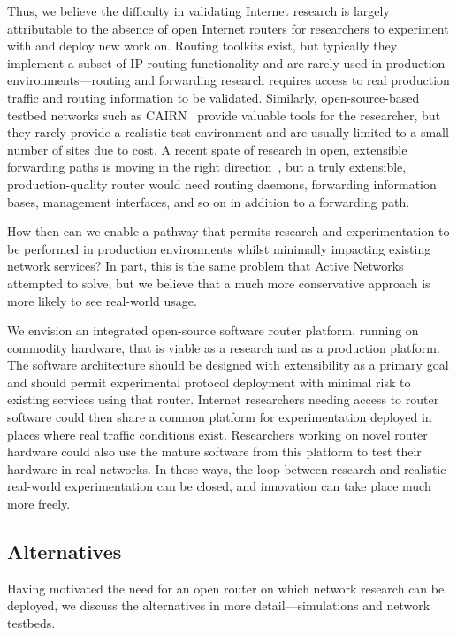 Thus, we believe the difficulty in validating Internet research is largely
attributable to
the absence of open Internet routers for researchers to
experiment with and deploy new work on.  Routing toolkits exist, but
typically they implement a subset of IP routing functionality and are
rarely used in production environments---routing and forwarding
research requires access to real production traffic and routing
information to be validated.
Similarly, open-source-based testbed networks such as CAIRN~\cite{cairn}
provide valuable tools for the researcher, 
but they rarely provide a realistic
test environment and are usually limited to a small number of sites
due to cost.
A recent spate of research in open, extensible forwarding
paths is moving in the right direction~\cite{click,pathrouter}, but
a truly extensible, production-quality router would need routing daemons,
forwarding information bases, management interfaces, and so on in addition
to a forwarding path.

How then can we enable a pathway that permits research and
experimentation to be performed in production environments whilst
minimally impacting existing network services?  In part, this
is the same problem that Active Networks attempted to solve, but we
believe that a much more conservative approach is more likely to see
real-world usage.

We envision an integrated open-source software router platform,
running on commodity hardware, that is viable as a research and as a
production platform.  The software architecture should be designed
with extensibility as a primary goal and should permit experimental
protocol deployment with minimal risk to existing services using that
router.  Internet researchers needing access to router software could
then share a common platform for experimentation
deployed in places where real traffic conditions exist.  Researchers
working on novel router hardware could also use the mature software
from this platform to test their hardware in real
networks. In these ways, the loop between research and realistic
real-world experimentation can be closed, and innovation can take
place much more freely.


\subsection{Alternatives}

Having motivated the need for an open router on which network research can
be deployed, we discuss the alternatives in more detail---simulations and
network testbeds.

